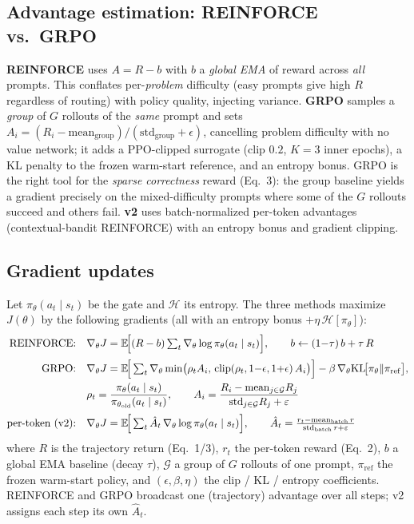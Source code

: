 \documentclass[11pt]{article}
\begin{document}
\subsection{Advantage estimation: REINFORCE vs.\ GRPO}
\textbf{REINFORCE} uses $A=R-b$ with $b$ a \emph{global EMA} of reward across \emph{all} prompts.
This conflates per-\emph{problem} difficulty (easy prompts give high $R$ regardless of routing)
with policy quality, injecting variance.
\textbf{GRPO} samples a \emph{group} of $G$ rollouts of the \emph{same} prompt and sets
$A_i=(R_i-\mathrm{mean}_{\text{group}})/(\mathrm{std}_{\text{group}}+\epsilon)$, cancelling problem
difficulty with no value network; it adds a PPO-clipped surrogate (clip $0.2$, $K{=}3$ inner
epochs), a KL penalty to the frozen warm-start reference, and an entropy bonus. GRPO is the right
tool for the \emph{sparse correctness} reward (Eq.~3): the group baseline yields a gradient
precisely on the mixed-difficulty prompts where some of the $G$ rollouts succeed and others fail.
\textbf{v2} uses batch-normalized per-token advantages (contextual-bandit REINFORCE) with an
entropy bonus and gradient clipping.

\subsection{Gradient updates}
Let $\pi_\theta(a_t\mid s_t)$ be the gate and $\mathcal{H}$ its entropy. The three methods maximize
$J(\theta)$ by the following gradients (all with an entropy bonus $+\eta\,\mathcal{H}[\pi_\theta]$):
\begin{align}
\text{REINFORCE:}\quad
&\nabla_\theta J = \mathbb{E}\!\Big[(R-b)\textstyle\sum_t \nabla_\theta\log\pi_\theta(a_t\mid s_t)\Big],
\qquad b \leftarrow (1{-}\tau)\,b + \tau\,R \\[2pt]
\text{GRPO:}\quad
&\nabla_\theta J = \mathbb{E}\!\Big[\textstyle\sum_t \nabla_\theta \min\!\big(\rho_t A_i,\,
\mathrm{clip}(\rho_t,1{-}\epsilon,1{+}\epsilon)\,A_i\big)\Big] - \beta\,\nabla_\theta\mathrm{KL}\!\big[\pi_\theta\Vert\pi_{\mathrm{ref}}\big], \notag\\
&\rho_t = \frac{\pi_\theta(a_t\mid s_t)}{\pi_{\theta_{\mathrm{old}}}(a_t\mid s_t)},
\qquad A_i = \frac{R_i-\mathrm{mean}_{j\in\mathcal{G}}R_j}{\mathrm{std}_{j\in\mathcal{G}}R_j+\varepsilon} \\[2pt]
\text{per-token (v2):}\quad
&\nabla_\theta J = \mathbb{E}\!\Big[\textstyle\sum_t \hat A_t\,\nabla_\theta\log\pi_\theta(a_t\mid s_t)\Big],
\qquad \hat A_t = \frac{r_t-\mathrm{mean}_{\mathrm{batch}}\,r}{\mathrm{std}_{\mathrm{batch}}\,r+\varepsilon}
\end{align}
where $R$ is the trajectory return (Eq.~1/3), $r_t$ the per-token reward (Eq.~2), $b$ a global EMA
baseline (decay $\tau$), $\mathcal{G}$ a group of $G$ rollouts of one prompt, $\pi_{\mathrm{ref}}$ the
frozen warm-start policy, and $(\epsilon,\beta,\eta)$ the clip / KL / entropy coefficients. REINFORCE
and GRPO broadcast one (trajectory) advantage over all steps; v2 assigns each step its own $\hat A_t$.
\end{document}

